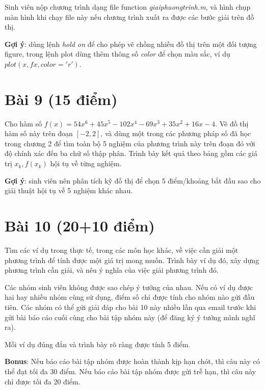\documentclass[12pt]{article}
\begin{document}
Sinh viên nộp chương trình dạng file function \emph{giaiphuongtrinh.m}, và hình chụp màn hình khi chạy file này nếu chương trình xuất ra được các bước giải trên đồ thị.

\textbf{Gợi ý}: dùng lệnh \emph{hold on} để cho phép vẽ chồng nhiều đồ thị trên một đối tượng figure, trong lệnh plot dùng thêm thông số \emph{color} để chọn màu sắc, ví dụ $plot(x,fx,color='r')$.

\section{Bài 9 (15 điểm)}
Cho hàm số $f(x) = 54x^6 + 45x^5 - 102x^4 - 69x^3 + 35x^2 + 16x -4$. Vẽ đồ thị hàm số này trên đoạn $[-2,2]$, và dùng một trong các phương pháp số đã học trong chương 2 để tìm toàn bộ 5 nghiệm của phương trình này trên đoạn đó với độ chính xác đến ba chữ số thập phân. Trình bày kết quả theo bảng gồm các giá trị $x_k, f(x_k)$ hội tụ về từng nghiệm.

\textbf{Gợi ý}: sinh viên nên phân tích kỹ đồ thị để chọn 5 điểm/khoảng bắt đầu sao cho giải thuật hội tụ về 5 nghiệm khác nhau.

\section{Bài 10 (20+10 điểm)}
Tìm các ví dụ trong thực tế, trong các môn học khác, về việc cần giải một phương trình để tính được một giá trị mong muốn. Trình bày ví dụ đó, xây dựng phương trình cần giải, và nêu ý nghĩa của việc giải phương trình đó.

Các nhóm sinh viên không được sao chép ý tưởng của nhau. Nếu có ví dụ được hai hay nhiều nhóm cùng sử dụng, điểm số chỉ được tính cho nhóm nào gửi đầu tiên. Các nhóm có thể gửi giải đáp cho bài 10 này nhiều lần qua email trước khi gửi bài báo cáo cuối cùng cho bài tập nhóm này (để đăng ký ý tưởng mình nghĩ ra).

Mỗi ví dụ đúng đắn và trình bày rõ ràng được tính 5 điểm.

\textbf{Bonus}: Nếu báo cáo bài tập nhóm được hoàn thành kịp hạn chót, thì câu này có thể đạt tối đa 30 điểm. Nếu báo cáo bài tập nhóm được gửi trễ hạn, thì câu này chỉ được tối đa 20 điểm.
\end{document}
